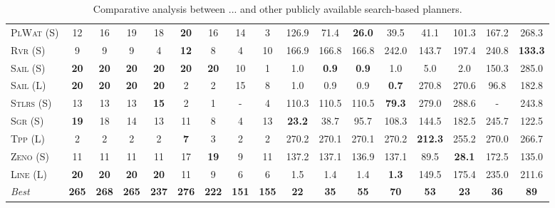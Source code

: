 \begin{table}[tb]
{\begin{tabular}{|l||cccccccc||cccccccc||}
\textsc{PlWat} (S)&12&16&19&18&\textbf{20}&16&14&3&126.9&71.4&\textbf{26.0}&39.5&41.1&101.3&167.2&268.3\\
\textsc{Rvr} (S)&9&9&9&4&\textbf{12}&8&4&10&166.9&166.8&166.8&242.0&143.7&197.4&240.8&\textbf{133.3}\\
\textsc{Sail} (S)&\textbf{20}&\textbf{20}&\textbf{20}&\textbf{20}&\textbf{20}&\textbf{20}&10&1&1.0&\textbf{0.9}&\textbf{0.9}&1.0&5.0&2.0&150.3&285.0\\
\textsc{Sail} (L)&\textbf{20}&\textbf{20}&\textbf{20}&\textbf{20}&2&2&15&8&1.0&0.9&0.9&\textbf{0.7}&270.8&270.6&96.8&182.8\\
\textsc{Stlrs} (S)&13&13&13&\textbf{15}&2&1&-&4&110.3&110.5&110.5&\textbf{79.3}&279.0&288.6&-&243.8\\
\textsc{Sgr} (S)&\textbf{19}&18&14&13&11&8&4&13&\textbf{23.2}&38.7&95.7&108.3&144.5&182.5&245.7&122.5\\
\textsc{Tpp} (L)&2&2&2&2&\textbf{7}&3&2&2&270.2&270.1&270.1&270.2&\textbf{212.3}&255.2&270.0&266.7\\
\textsc{Zeno} (S)&11&11&11&11&17&\textbf{19}&9&11&137.2&137.1&136.9&137.1&89.5&\textbf{28.1}&172.5&135.0\\
\textsc{Line} (L)&\textbf{20}&\textbf{20}&\textbf{20}&\textbf{20}&11&9&6&6&1.5&1.4&1.4&\textbf{1.3}&149.5&175.4&235.0&211.6
\\\hline
\textit{Best}&\textbf{265}&\textbf{268}&\textbf{265}&\textbf{237}&\textbf{276}&\textbf{222}&\textbf{151}&\textbf{155}&\textbf{22}&\textbf{35}&\textbf{55}&\textbf{70}&\textbf{53}&\textbf{23}&\textbf{36}&\textbf{89}\\\hline

        \end{tabular}}
        \caption{Comparative analysis between ... and other publicly available search-based planners.}
        \label{tab:search}
        \end{table}
        